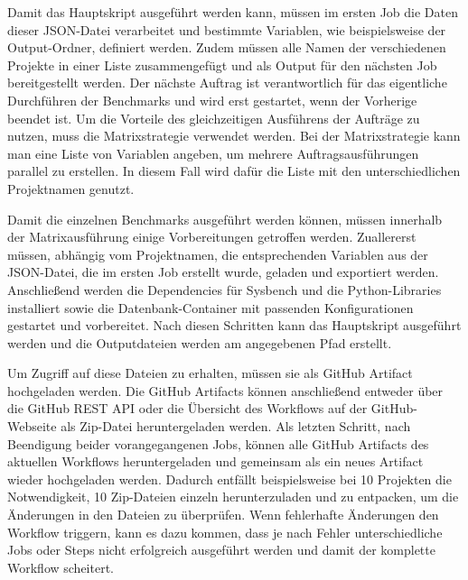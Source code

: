 Damit das Hauptskript ausgeführt werden kann, müssen im ersten Job die Daten dieser JSON-Datei verarbeitet und bestimmte Variablen, wie beispielsweise der Output-Ordner, definiert werden.
Zudem müssen alle Namen der verschiedenen Projekte in einer Liste zusammengefügt und als Output für den nächsten Job bereitgestellt werden.
Der nächste Auftrag ist verantwortlich für das eigentliche Durchführen der Benchmarks und wird erst gestartet, wenn der Vorherige beendet ist.
Um die Vorteile des gleichzeitigen Ausführens der Aufträge zu nutzen, muss die Matrixstrategie verwendet werden.
Bei der Matrixstrategie kann man eine Liste von Variablen angeben, um mehrere Auftragsausführungen parallel zu erstellen.
In diesem Fall wird dafür die Liste mit den unterschiedlichen Projektnamen genutzt.

Damit die einzelnen Benchmarks ausgeführt werden können, müssen innerhalb der Matrixausführung einige Vorbereitungen getroffen werden.
Zuallererst müssen, abhängig vom Projektnamen, die entsprechenden Variablen aus der JSON-Datei, die im ersten Job erstellt wurde, geladen und exportiert werden.
Anschließend werden die Dependencies für Sysbench und die Python-Libraries installiert sowie die Datenbank-Container mit passenden Konfigurationen gestartet und vorbereitet.
Nach diesen Schritten kann das Hauptskript ausgeführt werden und die Outputdateien werden am angegebenen Pfad erstellt.

Um Zugriff auf diese Dateien zu erhalten, müssen sie als GitHub Artifact hochgeladen werden.
Die GitHub Artifacts können anschließend entweder über die GitHub REST API oder die Übersicht des Workflows auf der GitHub-Webseite als Zip-Datei heruntergeladen werden.
Als letzten Schritt, nach Beendigung beider vorangegangenen Jobs, können alle GitHub Artifacts des aktuellen Workflows heruntergeladen und gemeinsam als ein neues Artifact wieder hochgeladen werden.
Dadurch entfällt beispielsweise bei 10 Projekten die Notwendigkeit, 10 Zip-Dateien einzeln herunterzuladen und zu entpacken, um die Änderungen in den Dateien zu überprüfen.
Wenn fehlerhafte Änderungen den Workflow triggern, kann es dazu kommen, dass je nach Fehler unterschiedliche Jobs oder Steps nicht erfolgreich ausgeführt werden und damit der komplette Workflow scheitert.

